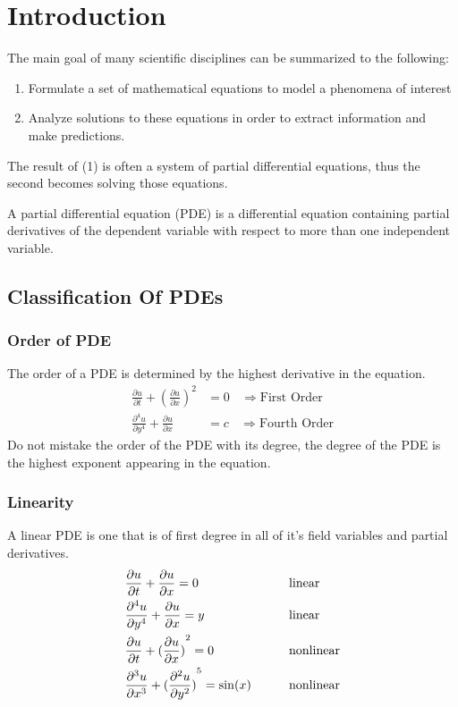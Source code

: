 \section{Introduction}
The main goal of many scientific disciplines can be summarized to the following:

\begin{enumerate}
\item Formulate a set of mathematical equations to model a phenomena of interest
\item Analyze solutions to these equations in order to extract information and make predictions.
\end{enumerate}

The result of (1) is often a system of partial differential equations, thus the second becomes solving those equations.
\ \\ 
\begin{definition}
    A partial differential equation (PDE) is a differential equation containing partial derivatives of the dependent variable with respect to more than one independent variable.
\end{definition}

\subsection{Classification Of PDEs}
\subsubsection{Order of PDE}
The order of a PDE is determined by the highest derivative in the equation.
\begin{align*}
\frac{\partial u}{\partial t} + {(\frac{\partial u}{\partial x})}^2 &= 0 \ \ \ \ \Longrightarrow  \text{First Order}
\\
\frac{\partial^4 u}{\partial y^4} + \frac{\partial u}{\partial x} &= c \ \ \ \ \Longrightarrow  \text{Fourth Order}
\end{align*}
Do not mistake the order of the PDE with its degree, the degree of the PDE is the highest exponent appearing in the equation.
\subsubsection{Linearity} 
A linear PDE is one that is of first degree in all of it's field variables and partial derivatives.
\begin{alignat*}{2}
&\frac{\partial u}{\partial t} + \frac{\partial u}{\partial x} = 0 &\quad\quad &\text{linear}
\\
&\frac{\partial^4 u}{\partial y^4} + \frac{\partial u}{\partial x} = y &\quad\quad &\text{linear}
\\
&\frac{\partial u}{\partial t} + {(\frac{\partial u}{\partial x})}^2 = 0 &\quad\quad &\text{nonlinear}
\\
&\frac{\partial^3 u}{\partial x^3} + {(\frac{\partial^2 u}{\partial y^2})}^5 = \sin(x) &\quad\quad &\text{nonlinear}
\end{alignat*}

